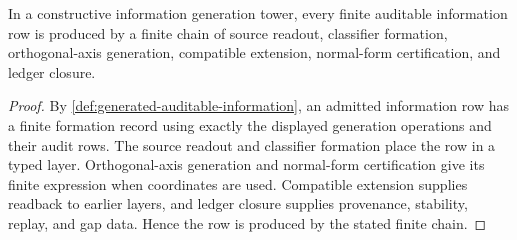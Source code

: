 \begin{theorem}
\label{thm:core-form-constructive-information-generation}
In a constructive information generation tower, every finite auditable
information row is produced by a finite chain of source readout,
classifier formation, orthogonal-axis generation, compatible extension,
normal-form certification, and ledger closure.
\end{theorem}

\begin{proof}
By \autoref{def:generated-auditable-information}, an admitted
information row has a finite formation record using exactly the displayed
generation operations and their audit rows. The source readout and
classifier formation place the row in a typed layer. Orthogonal-axis
generation and normal-form certification give its finite expression when
coordinates are used. Compatible extension supplies readback to earlier
layers, and ledger closure supplies provenance, stability, replay, and
gap data. Hence the row is produced by the stated finite chain.
\end{proof}

